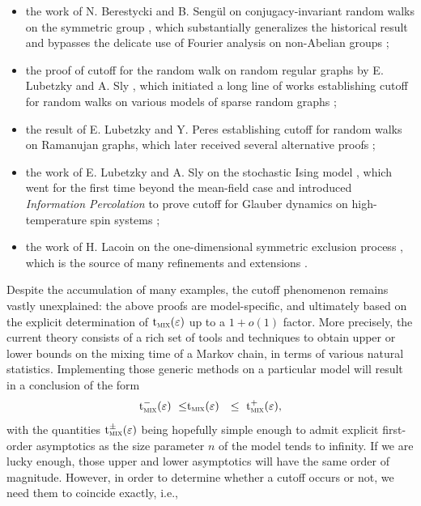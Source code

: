 \documentclass[12pt,final]{article}
\numberwithin{equation}{section}
\newcommand{\tmix}{{\rm t}_{\textsc{mix}}}
\begin{document}
\begin{itemize}
\item the work of N. Berestycki and B. Seng\"ul  on conjugacy-invariant random walks on the symmetric group \cite{MR3936154}, which substantially generalizes the historical result \cite{diaconis1981generating} and bypasses the delicate use of Fourier analysis on non-Abelian groups  \cite{MR964069,MR4152644,MR4312845,MR4367947,MR4021252};
\item the proof of cutoff for the random walk on random regular graphs by E. Lubetzky and A. Sly \cite{MR2667423}, which initiated a long line of works establishing cutoff for random walks on various models of sparse random graphs \cite{MR3758735,MR4132638,MR4385126,MR4476123,hermon2021cutoff,arxiv.2212.04469};
\item the result of E. Lubetzky and Y. Peres \cite{MR3558308} establishing cutoff for random walks on Ramanujan graphs, which later received several alternative proofs \cite{MR3693771,MR4178418,MR4476123};
\item the work of E. Lubetzky and A. Sly on the stochastic Ising model \cite{MR3020173}, which went for the first time beyond the mean-field case \cite{levin2010glauber,cuff2012glauber} and introduced \emph{Information Percolation}  to prove cutoff for Glauber dynamics on high-temperature spin systems \cite{lubetzky2014cutoff,MR3486171,MR4038041};
\item the work of H. Lacoin on the one-dimensional symmetric exclusion process \cite{MR3474475}, which is the source of many refinements and extensions  \cite{MR3551201,MR3689972,MR3320314,MR3945753,MR4021252,MR4291457,MR4152648,MR4421608,arxiv.2003.03781,arxiv.2110.06353}.
\end{itemize}
Despite the accumulation of many examples, the cutoff phenomenon remains vastly unexplained: the above proofs are model-specific, and ultimately based on the explicit determination of $\tmix(\varepsilon)$ up to a $1 + o(1)$ factor. More precisely, the current theory consists of a rich set of tools and techniques to obtain upper or lower bounds on the mixing time of a Markov chain, in terms of various natural statistics. Implementing those generic methods on a particular model will result in a conclusion of the form
\begin{eqnarray}
\label{bruteforce}
\tmix^-(\varepsilon) \ \le & \tmix(\varepsilon) & \le \ \tmix^+(\varepsilon),
\end{eqnarray}
with the quantities $\tmix^\pm(\varepsilon)$ being  hopefully simple enough to admit explicit first-order asymptotics as the size parameter $n$ of the model tends to infinity. If we are lucky enough, those upper and lower asymptotics will have the same order of magnitude. However, in order to determine whether a cutoff occurs or not, we need them to coincide exactly, i.e.,
\end{document}
